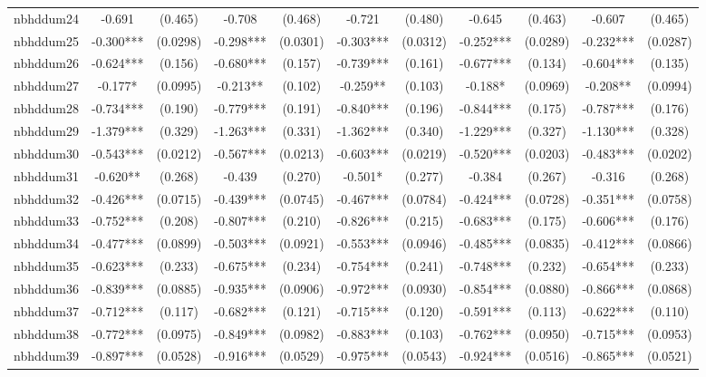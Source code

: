 \documentclass[]{article}
\begin{document}
\begin{tabular}{lcccccccccc}
nbhddum24 & -0.691 & (0.465) & -0.708 & (0.468) & -0.721 & (0.480) & -0.645 & (0.463) & -0.607 & (0.465) \\
nbhddum25 & -0.300*** & (0.0298) & -0.298*** & (0.0301) & -0.303*** & (0.0312) & -0.252*** & (0.0289) & -0.232*** & (0.0287) \\
nbhddum26 & -0.624*** & (0.156) & -0.680*** & (0.157) & -0.739*** & (0.161) & -0.677*** & (0.134) & -0.604*** & (0.135) \\
nbhddum27 & -0.177* & (0.0995) & -0.213** & (0.102) & -0.259** & (0.103) & -0.188* & (0.0969) & -0.208** & (0.0994) \\
nbhddum28 & -0.734*** & (0.190) & -0.779*** & (0.191) & -0.840*** & (0.196) & -0.844*** & (0.175) & -0.787*** & (0.176) \\
nbhddum29 & -1.379*** & (0.329) & -1.263*** & (0.331) & -1.362*** & (0.340) & -1.229*** & (0.327) & -1.130*** & (0.328) \\
nbhddum30 & -0.543*** & (0.0212) & -0.567*** & (0.0213) & -0.603*** & (0.0219) & -0.520*** & (0.0203) & -0.483*** & (0.0202) \\
nbhddum31 & -0.620** & (0.268) & -0.439 & (0.270) & -0.501* & (0.277) & -0.384 & (0.267) & -0.316 & (0.268) \\
nbhddum32 & -0.426*** & (0.0715) & -0.439*** & (0.0745) & -0.467*** & (0.0784) & -0.424*** & (0.0728) & -0.351*** & (0.0758) \\
nbhddum33 & -0.752*** & (0.208) & -0.807*** & (0.210) & -0.826*** & (0.215) & -0.683*** & (0.175) & -0.606*** & (0.176) \\
nbhddum34 & -0.477*** & (0.0899) & -0.503*** & (0.0921) & -0.553*** & (0.0946) & -0.485*** & (0.0835) & -0.412*** & (0.0866) \\
nbhddum35 & -0.623*** & (0.233) & -0.675*** & (0.234) & -0.754*** & (0.241) & -0.748*** & (0.232) & -0.654*** & (0.233) \\
nbhddum36 & -0.839*** & (0.0885) & -0.935*** & (0.0906) & -0.972*** & (0.0930) & -0.854*** & (0.0880) & -0.866*** & (0.0868) \\
nbhddum37 & -0.712*** & (0.117) & -0.682*** & (0.121) & -0.715*** & (0.120) & -0.591*** & (0.113) & -0.622*** & (0.110) \\
nbhddum38 & -0.772*** & (0.0975) & -0.849*** & (0.0982) & -0.883*** & (0.103) & -0.762*** & (0.0950) & -0.715*** & (0.0953) \\
nbhddum39 & -0.897*** & (0.0528) & -0.916*** & (0.0529) & -0.975*** & (0.0543) & -0.924*** & (0.0516) & -0.865*** & (0.0521) \\

\end{tabular}
\end{document}
